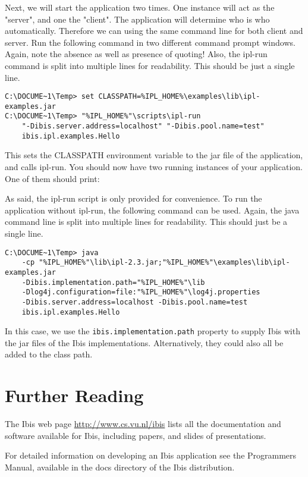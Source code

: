 \documentclass[a4paper,10pt]{article}
\begin{document}
Next, we will start the application two times. One instance will act as the
"server", and one the "client". The application will determine who is who
automatically. Therefore we can using the same command line for both client 
and server. Run the following command in two different command prompt windows.
Again, note the absence as well as presence of quoting! Also, the ipl-run
command is split into multiple lines for readability. This should be just a single
line.

\noindent
{\small
\begin{verbatim}
C:\DOCUME~1\Temp> set CLASSPATH=%IPL_HOME%\examples\lib\ipl-examples.jar
C:\DOCUME~1\Temp> "%IPL_HOME%"\scripts\ipl-run
    "-Dibis.server.address=localhost" "-Dibis.pool.name=test"
    ibis.ipl.examples.Hello
\end{verbatim}
}
\noindent

This sets the CLASSPATH environment variable to the jar file of the
application, and calls ipl-run. You should now have two running
instances of your application. One of them should print:

 \noindent 

As said, the ipl-run script is only provided for convenience. To run
the application without ipl-run, the following command can be used.
Again, the java command line is split into multiple lines for readability.
This should just be a single line.

\noindent
{\small
\begin{verbatim}
C:\DOCUME~1\Temp> java
    -cp "%IPL_HOME%"\lib\ipl-2.3.jar;"%IPL_HOME%"\examples\lib\ipl-examples.jar
    -Dibis.implementation.path="%IPL_HOME%"\lib
    -Dlog4j.configuration=file:"%IPL_HOME%"\log4j.properties
    -Dibis.server.address=localhost -Dibis.pool.name=test
    ibis.ipl.examples.Hello
\end{verbatim}
}
\noindent

In this case, we use the \texttt{ibis.implementation.path} property to supply Ibis
with the jar files of the Ibis implementations. Alternatively, they
could also all be added to the class path.

\section{Further Reading}

The Ibis web page \url{http://www.cs.vu.nl/ibis} lists all
the documentation and software available for Ibis, including papers, and
slides of presentations.

For detailed information on developing an Ibis application see the
Programmers Manual, available in the docs directory of the Ibis
distribution.
\end{document}
